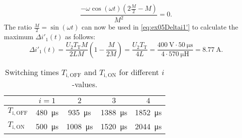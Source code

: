 \begin{solutionblock}
    \begin{equation}
        \frac{-\omega \cos(\omega t)(2 \frac{M}{2}-M)}{M^2}=0.
    \end{equation}
    The ratio $\frac{M}{2}=\sin(\omega t)$ can now be used in \eqref{eq:ex05Deltai1'} to calculate the maximum $\Delta i'_{\mathrm{1}}(t)$ as follows:
    \begin{equation}
        \Delta i'_{\mathrm{1}}(t) = \frac{U_{\mathrm{2}}T_{\mathrm{T}}M}{2LM}\left(1-\frac{M}{2M}\right) = \frac{U_{\mathrm{2}}T_{\mathrm{T}}}{4L}=\frac{\SI{400}{\volt}\cdot \SI{50}{\micro\s}}{4\cdot\SI{570}{\micro\henry}} = \SI{8.77}{\ampere}.
    \end{equation}
\end{solutionblock}


\begin{table}[ht]
    \centering
    
    \begin{tabular}{lcccc}
        \toprule
        & $i = 1$ & $2$ & $3$ & $4$ \\
        \midrule
       $T_\mathrm{i,OFF}$& \SI{480}{\micro\second} & \SI{935}{\micro\second} & \SI{1388}{\micro\second} & \SI{1852}{\micro\second} \\
        $T_\mathrm{i,ON}$  & \SI{500}{\micro\second} & \SI{1008}{\micro\second} & \SI{1520}{\micro\second} & \SI{2044}{\micro\second} \\
        \bottomrule
    \end{tabular}
    \caption{Switching times $T_\mathrm{i,OFF}$ and $T_\mathrm{i,ON}$ for different $i$-values.}
    \label{tab:switching_times}
\end{table}

